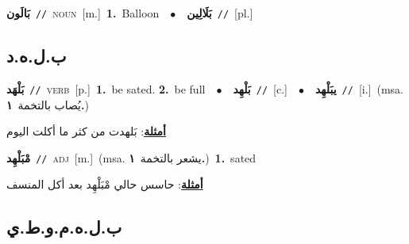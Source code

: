 \documentclass[10pt,a4paper,twoside]{article} %
\begin{document}
\begin{multicols}{2}
{\setlength\topsep{0pt}\textbf{\foreignlanguage{arabic}{بَالَون}}\ {\color{gray}\texttt{//}\color{black}}\ \textsc{noun}\ [m.]\ \textbf{1.}~Balloon\ \ $\bullet$\ \ \setlength\topsep{0pt}\textbf{\foreignlanguage{arabic}{بَلَالِين}}\ {\color{gray}\texttt{//}\color{black}}\ [pl.]\ } \vspace{2mm}

\vspace{-3mm}
\subsection*{\color{blue}\foreignlanguage{arabic}{ب.ل.ه.د}\color{blue}{}} 

{\setlength\topsep{0pt}\textbf{\foreignlanguage{arabic}{بَلْهَد}}\ {\color{gray}\texttt{//}\color{black}}\ \textsc{verb}\ [p.]\ \textbf{1.}~be sated.  \textbf{2.}~be full\ \ $\bullet$\ \ \setlength\topsep{0pt}\textbf{\foreignlanguage{arabic}{بَلْهِد}}\ {\color{gray}\texttt{//}\color{black}}\ [c.]\ \ $\bullet$\ \ \setlength\topsep{0pt}\textbf{\foreignlanguage{arabic}{يبَلْهِد}}\ {\color{gray}\texttt{//}\color{black}}\ [i.]\ \color{gray}(msa. \foreignlanguage{arabic}{يُصاب بالتخمة}~\foreignlanguage{arabic}{\textbf{١.}})\color{black}\  \begin{flushright}\color{gray}\foreignlanguage{arabic}{\textbf{\underline{\foreignlanguage{arabic}{أمثلة}}}: بَلهدت من كثر ما أكلت اليوم}\end{flushright}\color{black}} \vspace{2mm}

{\setlength\topsep{0pt}\textbf{\foreignlanguage{arabic}{مْبَلْهِد}}\ {\color{gray}\texttt{//}\color{black}}\ \textsc{adj}\ [m.]\ \color{gray}(msa. \foreignlanguage{arabic}{يشعر بالتخمة}~\foreignlanguage{arabic}{\textbf{١.}})\color{black}\ \textbf{1.}~sated\  \begin{flushright}\color{gray}\foreignlanguage{arabic}{\textbf{\underline{\foreignlanguage{arabic}{أمثلة}}}: حاسس حالي مْبَلْهِد بعد أكل المنسف}\end{flushright}\color{black}} \vspace{2mm}

\vspace{-3mm}
\subsection*{\color{blue}\foreignlanguage{arabic}{ب.ل.ه.م.و.ط.ي}\color{blue}{ (ntws)}} 


\end{multicols}
\end{document}
